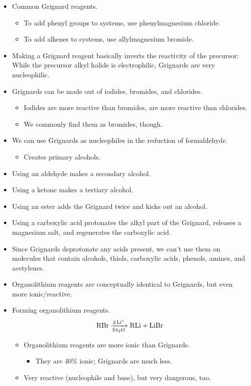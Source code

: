 \documentclass[../notes.tex]{subfiles}
\begin{document}
\begin{itemize}
\begin{itemize}
\begin{itemize}
        \end{itemize}
    \end{itemize}
    \item Common Grignard reagents.
    \begin{itemize}
        \item To add phenyl groups to systems, use phenylmagnesium chloride.
        \item To add alkenes to systems, use allylmagnesium bromide.
    \end{itemize}
    \item Making a Grignard reagent basically inverts the reactivity of the precursor: While the precursor alkyl halide is electrophilic, Grignards are very nucleophilic.
    \item Grignards can be made out of iodides, bromides, and chlorides.
    \begin{itemize}
        \item Iodides are more reactive than bromides, are more reactive than chlorides.
        \item We commonly find them as bromides, though.
    \end{itemize}
    \item We can use Grignards as nucleophiles in the reduction of formaldehyde.
    \begin{itemize}
        \item Creates primary alcohols.
    \end{itemize}
    \item Using an aldehyde makes a secondary alcohol.
    \item Using a ketone makes a tertiary alcohol.
    \item Using an ester adds the Grignard twice and kicks out an alcohol.
    \item Using a carboxylic acid protonates the alkyl part of the Grignard, releases a magnesium salt, and regenerates the carboxylic acid.
    \item Since Grignards deprotonate any acids present, we can't use them on molecules that contain alcohols, thiols, carboxylic acids, phenols, amines, and acetylenes.
    \item Organolithium reagents are conceptually identical to Grignards, but even more ionic/reactive.
    \item Forming organolithium reagents.
    \begin{equation*}
        \ce{RBr ->[2Li^\circ][Et2O] RLi + LiBr}
    \end{equation*}
    \begin{itemize}
        \item Organolithium reagents are more ionic than Grignards.
        \begin{itemize}
            \item They are 40\% ionic; Grignards are much less.
        \end{itemize}
        \item Very reactive (nucleophile and base), but very dangerous, too.
    \end{itemize}
\end{itemize}
\end{document}
